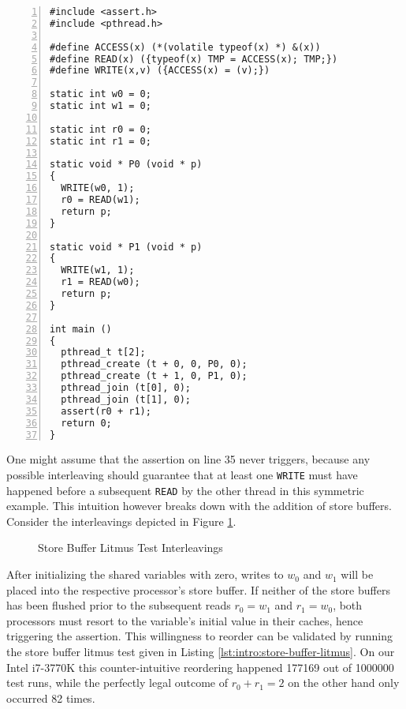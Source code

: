 \begin{lstlisting}[style=c++, numbers=left, numberstyle=\footnotesize, numberblanklines=false, caption={Store Buffer Litmus Test}, label={lst:intro:store-buffer-litmus}]
#include <assert.h>
#include <pthread.h>

#define ACCESS(x) (*(volatile typeof(x) *) &(x))
#define READ(x) ({typeof(x) TMP = ACCESS(x); TMP;})
#define WRITE(x,v) ({ACCESS(x) = (v);})

static int w0 = 0;
static int w1 = 0;

static int r0 = 0;
static int r1 = 0;

static void * P0 (void * p)
{
  WRITE(w0, 1);
  r0 = READ(w1);
  return p;
}

static void * P1 (void * p)
{
  WRITE(w1, 1);
  r1 = READ(w0);
  return p;
}

int main ()
{
  pthread_t t[2];
  pthread_create (t + 0, 0, P0, 0);
  pthread_create (t + 1, 0, P1, 0);
  pthread_join (t[0], 0);
  pthread_join (t[1], 0);
  assert(r0 + r1);
  return 0;
}
\end{lstlisting}

One might assume that the assertion on line 35 never triggers, because any possible interleaving should guarantee that at least one \lstinline[style=c++]{WRITE} must have happened before a subsequent \lstinline[style=c++]{READ} by the other thread in this symmetric example.
This intuition however breaks down with the addition of store buffers.
Consider the interleavings depicted in Figure \ref{fig:intro:store-buffer-litmus-interleaving}.
\begin{figure}[!h]
  \centering
  
  \caption{Store Buffer Litmus Test Interleavings}
  \label{fig:intro:store-buffer-litmus-interleaving}
\end{figure}
After initializing the shared variables with zero, %
writes to $w_0$ and $w_1$ will be placed into the respective processor's store buffer.
If neither of the store buffers has been flushed prior to the subsequent reads $r_0 = w_1$ and $r_1 = w_0$, both processors must resort to the variable's initial value in their caches,
hence triggering the assertion.
This willingness to reorder can be validated by running the store buffer litmus test given in Listing \ref{lst:intro:store-buffer-litmus}.
On our Intel i7-3770K this counter-intuitive reordering happened 177169 out of 1000000 test runs, while the perfectly legal outcome of $r_0 + r_1 = 2$ on the other hand only occurred 82 times.


